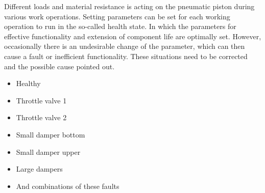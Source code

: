 Different loads and material resistance is acting on the pneumatic piston
during various work operations. Setting parameters can be set for each
working operation to run in the so-called health state. In which the
parameters for effective functionality and extension of component life are
optimally set. However, occasionally there is an undesirable change of the
parameter, which can then cause a fault or inefficient functionality. These
situations need to be corrected and the possible cause pointed out.




\begin{itemize}
    \item Healthy
    \item Throttle valve 1
    \item Throttle valve 2 
    \item Small damper bottom
    \item Small damper upper
    \item Large dampers 
    \item And combinations of these faults
\end{itemize}


